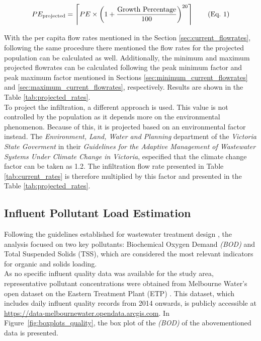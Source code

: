 \documentclass[12pt]{article}
\begin{document}
\begin{align}
  \refstepcounter{equation}
  PE_{\text{projected}} = \left\lceil PE \times \left(1 + \frac{\text{Growth Percentage}}{100} \right)^{20} \right\rceil 
  \tag{Eq.~\theequation} \label{eq:population_projection}
\end{align}

With the per capita flow rates mentioned in the Section \ref{sec:current_flowrates}, following the same procedure there mentioned
the flow rates for the projected population can be calculated as well. Additionally, the minimum and maximum projected flowrates
can be calculated following the peak minimum factor and peak maximum factor mentioned in Sections \ref{sec:minimum_current_flowrates}
and \ref{sec:maximum_current_flowrates}, respectively. Results are shown in the Table \ref{tab:projected_rates}.\\

To project the infiltration, a different approach is used. This value is not controlled by
the population as it depends more on the environmental phenomenon. Because of this, it is projected
based on an environmental factor instead. The \textit{Environment, Land, Water and Planning} department
of the \textit{Victoria State Goverment} in their \textit{Guidelines for the Adaptive Management of 
Wastewater Systems Under Climate Change in Victoria}, especified that the climate change factor
can be taken as 1.2. The infiltration flow rate presented in Table \ref{tab:current_rates} is therefore multiplied by this
factor and presented in the Table \ref{tab:projected_rates}.




\subsection{Influent Pollutant Load Estimation}
\label{sec:pollutant_load}

Following the guidelines established for wastewater treatment design 
\cite{wef_DesignWaterResource, metcalf_2014_wastewater}, the analysis focused on two key 
pollutants: Biochemical Oxygen Demand \textit{(BOD)} and Total Suspended Solids (TSS), which 
are considered the most relevant indicators for organic and solids loading.\\

As no specific influent quality data was available for the study area, 
representative pollutant concentrations were obtained from Melbourne Water’s open 
dataset on the Eastern Treatment Plant (ETP) \cite{melbournewater_2024_etpdata}. 
This dataset, which includes daily influent quality records from 2014 onwards, is 
publicly accessible at \url{https://data-melbournewater.opendata.arcgis.com}.
In Figure~\ref{fig:boxplots_quality}, 
the box plot of the \textit{(BOD)} of the abovementioned data is presented. 
\end{document}
